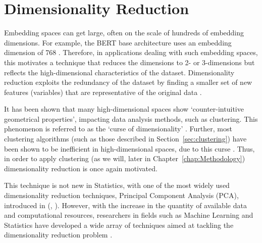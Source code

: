 \documentclass[10pt,oneside]{report}
\renewcommand{\citet}[1]{\citeauthor{#1}, \citeyear{#1}}
\begin{document}
\section{Dimensionality Reduction}\label{sec:dimred}

Embedding spaces can get large, often on the scale of hundreds of embedding dimensions. For example, the BERT base architecture uses an embedding dimension of 768 \cite{devlin2019bert}. Therefore, in applications dealing with such embedding spaces, this motivates a technique that reduces the dimensions to 2- or 3-dimensions but reflects the high-dimensional characteristics of the dataset. 
Dimensionality reduction exploits the redundancy of the dataset by finding a smaller set of new features (variables) that are representative of the original data \cite{sorzano2014survey}.

It has been shown that many high-dimensional spaces show `counter-intuitive geometrical properties', impacting data analysis methods, such as clustering. This phenomenon is referred to as the `curse of dimensionality' \cite{verleysen2005curse, hinneburg1999optimal}. Further, most clustering algorithms (such as those described in Section~\ref{sec:clustering}) have been shown to be inefficient in high-dimensional spaces, due to this curse \cite{hinneburg1999optimal}. Thus, in order to apply clustering (as we will, later in Chapter~\ref{chap:Methodology}) dimensionality reduction is once again motivated.

This technique is not new in Statistics, with one of the most widely used dimensionality reduction techniques, Principal Component Analysis (PCA), introduced in (\citet{pearson1901liii}). However, with the increase in the quantity of available data and computational resources, researchers in fields such as Machine Learning and Statistics have developed a wide array of techniques aimed at tackling the dimensionality reduction problem \cite{sorzano2014survey}.
\end{document}
